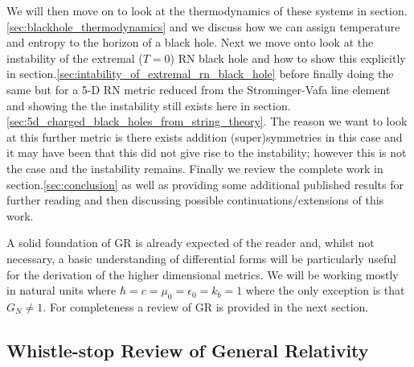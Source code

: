 \documentclass[12pt]{article}
\numberwithin{equation}{section}
\numberwithin{figure}{section}
\begin{document}
We will then move on to look at the thermodynamics of these systems in section.\ref{sec:blackhole_thermodynamics} and we discuss how we can assign temperature and entropy to the horizon of a black hole. Next we move onto look at the instability of the extremal ($T=0$) RN black hole and how to show this explicitly in section.\ref{sec:intability_of_extremal_rn_black_hole} before finally doing the same but for a 5-D RN metric reduced from the Strominger-Vafa line element and showing the the instability still exists here in section.\ref{sec:5d_charged_black_holes_from_string_theory}. The reason we want to look at this further metric is there exists addition (super)symmetries in this case and it may have been that this did not give rise to the instability; however this is not the case and the instability remains. Finally we review the complete work in section.\ref{sec:conclusion} as well as providing some additional published results for further reading and then discussing possible continuations/extensions of this work. 

A solid foundation of GR is already expected of the reader and, whilst not necessary, a basic understanding of differential forms will be particularly useful for the derivation of the higher dimensional metrics. We will be working mostly in natural units where $\hbar = c =\mu_{0} = \epsilon_{0} = k_b = 1$ where the only exception is that $G_{N}\ne 1$. For completeness a review of GR is provided in the next section. 
%
%
\subsection{Whistle-stop Review of General Relativity}
\end{document}
